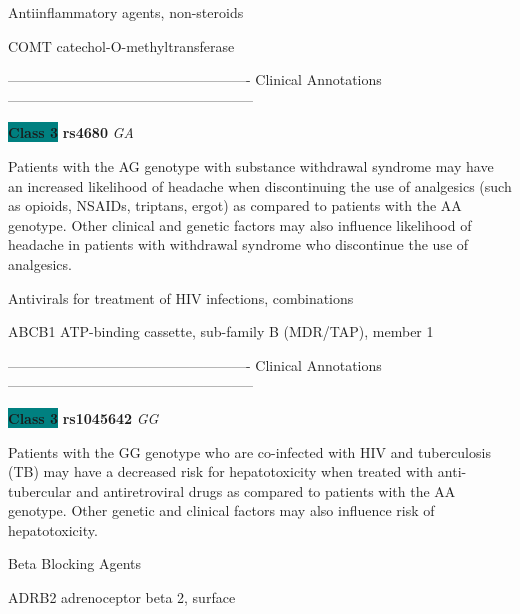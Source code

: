 \documentclass{resume} %
\begin{document}
\begin{rSection}{ Antiinflammatory agents, non-steroids }
\begin{rSubsection}{ COMT }{ catechol-O-methyltransferase }{}{}
\item[]

\item[] ---------------------------------------------------- Clinical Annotations -----------------------------------------------------\newline
\item \textbf{\colorbox{teal} {Class 3}} \textbf{ rs4680 } \textit{ GA }
\item[] Patients with the AG genotype with substance withdrawal syndrome may have an increased likelihood of headache when discontinuing the use of analgesics (such as opioids, NSAIDs, triptans, ergot) as compared to patients with the AA genotype. Other clinical and genetic factors may also influence likelihood of headache in patients with withdrawal syndrome who discontinue the use of analgesics.
\end{rSubsection}

\end{rSection}\begin{rSection}{ Antivirals for treatment of HIV infections, combinations }
\item[]

\begin{rSubsection}{ ABCB1 }{ ATP-binding cassette, sub-family B (MDR/TAP), member 1 }{}{}
\item[]

\item[] ---------------------------------------------------- Clinical Annotations -----------------------------------------------------\newline
\item \textbf{\colorbox{teal} {Class 3}} \textbf{ rs1045642 } \textit{ GG }
\item[] Patients with the GG genotype who are co-infected with HIV and tuberculosis (TB) may have a decreased risk for hepatotoxicity when treated with anti-tubercular and antiretroviral drugs as compared to patients with the AA genotype. Other genetic and clinical factors may also influence risk of hepatotoxicity.
\end{rSubsection}

\end{rSection}\begin{rSection}{ Beta Blocking Agents }
\item[]

\begin{rSubsection}{ ADRB2 }{ adrenoceptor beta 2, surface }{}{}
\item[]


\end{rSubsection}
\end{rSection}
\end{document}
